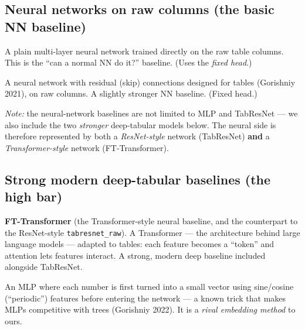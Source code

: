 \documentclass[11pt]{article}
\newcommand{\code}[1]{\texttt{#1}}
\begin{document}
\subsection{Neural networks on raw columns (the basic NN baseline)}
\begin{description}[leftmargin=2.2em,style=nextline,itemsep=2pt]
  \item[\code{mlp\_raw}] A plain multi-layer neural network trained directly on the
  raw table columns. This is the ``can a normal NN do it?'' baseline. (Uses the
  \emph{fixed head}.)
  \item[\code{tabresnet\_raw}] A neural network with residual (skip) connections
  designed for tables (Gorishniy 2021), on raw columns. A slightly stronger NN
  baseline. (Fixed head.)
\end{description}
\noindent\emph{Note:} the neural-network baselines are not limited to MLP and
TabResNet --- we also include the two \emph{stronger} deep-tabular models below.
The neural side is therefore represented by both a \emph{ResNet-style} network
(TabResNet) \textbf{and} a \emph{Transformer-style} network (FT-Transformer).

\subsection{Strong modern deep-tabular baselines (the high bar)}
\begin{description}[leftmargin=2.2em,style=nextline,itemsep=2pt]
  \item[\code{ft\_transformer}] \textbf{FT-Transformer} (the Transformer-style
  neural baseline, and the counterpart to the ResNet-style \code{tabresnet\_raw}).
  A Transformer --- the architecture behind large language models --- adapted to
  tables: each feature becomes a ``token'' and attention lets features interact.
  A strong, modern deep baseline included alongside TabResNet.
  \item[\code{num\_embed\_mlp}] An MLP where each number is first turned into a
  small vector using sine/cosine (``periodic'') features before entering the
  network --- a known trick that makes MLPs competitive with trees (Gorishniy
  2022). It is a \emph{rival embedding method} to ours.
\end{description}
\end{document}
